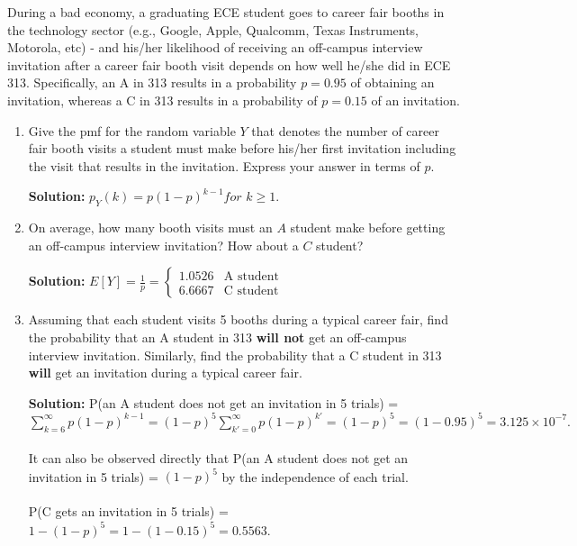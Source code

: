 \documentclass{book}
\begin{document}
During a bad economy, a graduating ECE student goes to career fair booths in the technology
sector (e.g., Google, Apple, Qualcomm, Texas Instruments, Motorola, etc) - and his/her
likelihood of receiving an off-campus interview invitation after a career fair booth visit depends
on how well he/she did in ECE 313. Specifically, an A in 313 results in a probability $p = 0.95$ of obtaining an invitation, whereas a C in 313 results in a probability of $p = 0.15$ of an invitation.
\begin{enumerate}
	\item Give the pmf for the random variable $Y$ that denotes the number of career fair booth visits a student must make before his/her first invitation including the visit that results in the invitation. Express your answer in terms of $p$.
	
\textbf{Solution:} $p_Y(k) = p(1 − p)^{k−1} for \hspace{4pt}k \geq 1.$
	\item On average, how many booth visits must an $A$ student make before getting an off-campus interview invitation? How about a $C$ student?

\textbf{Solution:} $E[Y] = \frac{1}{p} = \left\{ \begin{array}{ll}
			1.0526 & \mbox{A student}\\
			6.6667 & \mbox{C student}
		\end{array} \right.$

\item Assuming that each student visits 5 booths during a typical career fair, find the probability that an A student in 313 \textbf{will not} get an off-campus interview invitation. Similarly, find the probability that a C student in 313 \textbf{will} get an invitation during a typical career fair.
	
\textbf{Solution:} 
P(an A student does not get an invitation in 5 trials) = $\sum_{k=6}^{\infty}{p(1 - p)^{k-1}} = (1 - p)^5 \sum_{k'=0}^{\infty}{p(1 - p)^{k'}} = (1 - p)^5 = (1 - 0.95)^5 = 3.125 \times 10^{-7}.$
\\
\\
It can also be observed directly that P(an A student does not get an invitation in 5 trials) = $(1 - p)^5$ by the independence of each trial.
\\
\\
P(C gets an invitation in 5 trials) = $1 - (1 - p)^5 = 1 - (1 - 0.15)^5 = 0.5563$.
\end{enumerate}
\end{document}
